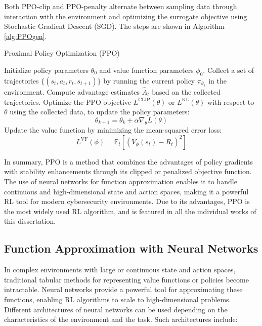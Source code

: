 Both PPO-clip and PPO-penalty alternate between sampling data through interaction with the environment and optimizing the surrogate objective using Stochastic Gradient Descent (\gls{SGD}).
The steps are shown in Algorithm \ref{alg:PPOgen}.

\begin{algorithm}
\caption{Proximal Policy Optimization (PPO)}
\label{alg:PPOgen}
\begin{algorithmic}[1]
\STATE Initialize policy parameters $\theta_0$ and value function parameters $\phi_0$.
    \STATE Collect a set of trajectories $\{(s_t, a_t, r_t, s_{t+1})\}$ by running the current policy $\pi_{\theta_k}$ in the environment.
    \STATE Compute advantage estimates $\hat{A}_t$ based on the collected trajectories.
    \setlength{\abovedisplayskip}{3pt}
    \setlength{\belowdisplayskip}{3pt}
    \STATE Optimize the PPO objective $L^{\text{CLIP}}(\theta)$ or $L^{\text{KL}}(\theta)$ with respect to $\theta$ using the collected data, to update the policy parameters:
    \[
    \theta_{k+1} = \theta_k + \alpha \nabla_\theta L(\theta)
    \]
    \STATE Update the value function by minimizing the mean-squared error loss:
    \[
    L^{\text{VF}}(\phi) = \mathbb{E}_t \left[ (V_{\phi}(s_t) - R_t)^2 \right]
    \]
\ENDFOR
\end{algorithmic}
\end{algorithm}

In summary, \gls{PPO} is a method that combines the advantages of policy gradients with stability enhancements through its clipped or penalized objective function.
The use of neural networks for function approximation enables it to handle continuous and high-dimensional state and action spaces, making it a powerful \gls{RL} tool for modern cybersecurity environments.
Due to its advantages, \gls{PPO} is the most widely used RL algorithm, and is featured in all the individual works of this dissertation.

\subsection{Function Approximation with Neural Networks}

In complex environments with large or continuous state and action spaces, traditional tabular methods for representing value functions or policies become intractable.
Neural networks provide a powerful tool for approximating these functions, enabling RL algorithms to scale to high-dimensional problems.
Different architectures of neural networks can be used depending on the characteristics of the environment and the task.
Such architectures include:

